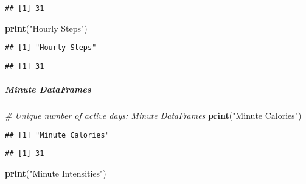 \documentclass[
]{article}
\newenvironment{Shaded}{\begin{snugshade}}{\end{snugshade}}
\newcommand{\CommentTok}[1]{\textcolor[rgb]{0.56,0.35,0.01}{\textit{#1}}}
\newcommand{\FunctionTok}[1]{\textcolor[rgb]{0.13,0.29,0.53}{\textbf{#1}}}
\newcommand{\NormalTok}[1]{#1}
\newcommand{\SpecialCharTok}[1]{\textcolor[rgb]{0.81,0.36,0.00}{\textbf{#1}}}
\newcommand{\StringTok}[1]{\textcolor[rgb]{0.31,0.60,0.02}{#1}}
\begin{document}
\begin{verbatim}
## [1] 31
\end{verbatim}

\begin{Shaded}
\begin{Highlighting}[]
\FunctionTok{print}\NormalTok{(}\StringTok{"Hourly Steps"}\NormalTok{)}
\end{Highlighting}
\end{Shaded}

\begin{verbatim}
## [1] "Hourly Steps"
\end{verbatim}

\begin{Shaded}
\end{Shaded}

\begin{verbatim}
## [1] 31
\end{verbatim}

\hypertarget{minute-dataframes-3}{%
\subparagraph{Minute DataFrames}\label{minute-dataframes-3}}

\begin{Shaded}
\begin{Highlighting}[]
\CommentTok{\# Unique number of active days: Minute DataFrames}
\FunctionTok{print}\NormalTok{(}\StringTok{"Minute Calories"}\NormalTok{)}
\end{Highlighting}
\end{Shaded}

\begin{verbatim}
## [1] "Minute Calories"
\end{verbatim}

\begin{Shaded}
\end{Shaded}

\begin{verbatim}
## [1] 31
\end{verbatim}

\begin{Shaded}
\begin{Highlighting}[]
\FunctionTok{print}\NormalTok{(}\StringTok{"Minute Intensities"}\NormalTok{)}
\end{Highlighting}
\end{Shaded}
\end{document}
